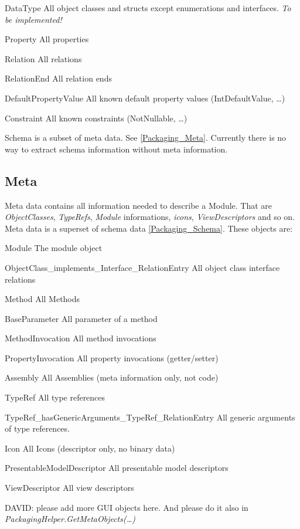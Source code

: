 \begin{descriptionBorder}
	\item[DataType] { All object classes and structs except enumerations and interfaces. \emph{To be implemented!} }
	\item[Property] { All properties }
	\item[Relation] { All relations }
	\item[RelationEnd] { All relation ends }
	\item[DefaultPropertyValue] { All known default property values (IntDefaultValue, \ldots) }
	\item[Constraint] { All known constraints (NotNullable, \ldots) }
\end{descriptionBorder}

\par
Schema is a subset of meta data. See \ref{Packaging_Meta}. Currently there is no way to extract schema information without meta information.


\subsection{\label{Packaging_Meta}Meta}

Meta data contains all information needed to describe a Module. That are \emph{ObjectClasses}, \emph{TypeRefs}, \emph{Module} informations, \emph{icons}, \emph{ViewDescriptors} and so on. 
Meta data is a superset of schema data \ref{Packaging_Schema}. These objects are:

\begin{descriptionBorder}
	\item[Module] { The module object }
	\item[ObjectClass\_implements\_Interface\_RelationEntry] { All object class interface relations }
	\item[Method] { All Methods }
	\item[BaseParameter] { All parameter of a method }
	\item[MethodInvocation] { All method invocations }
	\item[PropertyInvocation] { All property invocations (getter/setter) }
	\item[Assembly] { All Assemblies (meta information only, not code) }
	\item[TypeRef] { All type references }
	\item[TypeRef\_hasGenericArguments\_TypeRef\_RelationEntry] { All generic arguments of type references. }
	\item[Icon] { All Icons (descriptor only, no binary data) }
	\item[PresentableModelDescriptor] { All presentable model descriptors }
	\item[ViewDescriptor] { All view descriptors }
	\item[DAVID: ] { please add more GUI objects here. And please do it also in \emph{PackagingHelper.GetMetaObjects(\ldots)} }
\end{descriptionBorder}

